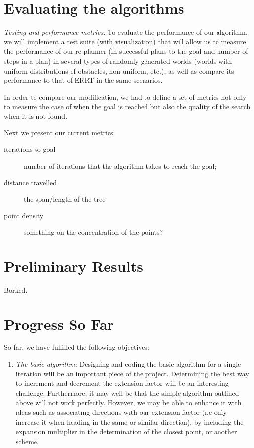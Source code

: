 \documentclass[11pt,twoside,twocolumn]{article}
\begin{document}
\section{Evaluating the algorithms}

{\it Testing and performance metrics:} To evaluate the performance of our algorithm, we will implement a test suite (with visualization) that will allow us to measure the performance of our re-planner (in successful plans to the goal and number of steps in a plan) in several types of randomly generated worlds (worlds with uniform distributions of obstacles, non-uniform, etc.), as well as compare its performance to that of ERRT in the same
scenarios.

In order to compare our modification, we had to define a set of metrics not only to measure the case of when the goal is reached but also the quality of the search when it is not found.

Next we present our current metrics:
\begin{description}
\item[iterations to goal] number of iterations that the algorithm takes to reach the goal;
\item[distance travelled] the span/length of the tree
\item[point density] something on the concentration of the points?
\end{description}

\section{Preliminary Results}

Borked.

\section{Progress So Far}

So far, we have fulfilled the following objectives:

\begin{enumerate}
\item {\it The basic algorithm:}  Designing and coding the basic algorithm for a single iteration will be an important piece of the project.  Determining the best way to increment and decrement the extension factor will be an interesting challenge.  Furthermore, it may well be that the simple algorithm outlined above will not work perfectly.  However, we may be able to enhance it with ideas such as associating directions with our extension factor (i.e only increase it when heading in the same or similar direction), by including the expansion multiplier in the determination of the closest point, or another scheme.

\end{enumerate}
\end{document}
